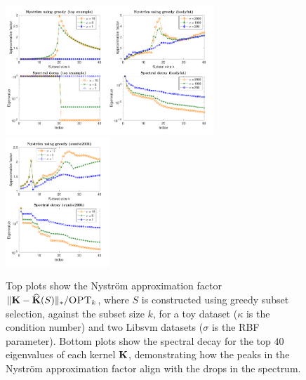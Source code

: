 \documentclass{article}
\begin{document}
\begin{figure}[t]
  \includegraphics[width=0.35\textwidth]{figs/nystrom/rbf-toy-greedy}\hspace{-5mm}\nolinebreak\includegraphics[width=0.35\textwidth]{figs/nystrom/rbf-bodyfat-greedy}\hspace{-5mm}\nolinebreak\includegraphics[width=0.35\textwidth]{figs/nystrom/rbf-eunite2001-greedy}
  \fi
  \caption{Top plots show the Nystr\"om approximation factor
    $\|\mathbf K-{\widehat{\mathbf K}}(S)\|_*/{\textsc{OPT}_k}$,
    where $S$ is constructed using greedy subset selection,
    against the subset size $k$, for a toy dataset
    ($\kappa$ is the condition number) and two
    Libsvm datasets ($\sigma$ is the RBF parameter). Bottom plots show
    the spectral decay for  the top $40$ eigenvalues  of each kernel
    $\mathbf K$,  demonstrating how the peaks in the Nystr\"om approximation
    factor align with the drops in the spectrum.}
\vspace{-2mm}
  \label{f:greedy}
\end{figure}
\end{document}
